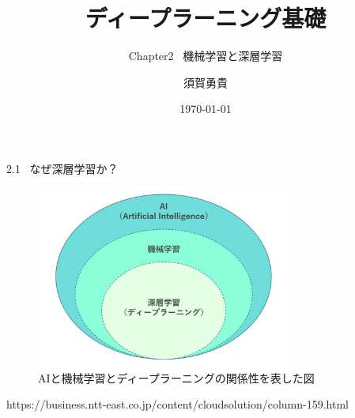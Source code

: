 \documentclass[dvipdfmx,8pt]{beamer}
\title{ディープラーニング基礎}
\subtitle{Chapter2 \ 機械学習と深層学習}
\author[須賀]{須賀勇貴}
\institute[茨大]{茨城大学大学院 \ 理工学研究科 \ 量子線科学専攻 \ 1年}
\date{\today}
\begin{document}
\frame{\maketitle}

  \begin{frame}{2.1 \ なぜ深層学習か？}
    \begin{figure}
      \begin{center}
        \includegraphics[height=6cm]{./AI_ML_DL.png}
      \end{center} 
      \caption{AIと機械学習とディープラーニングの関係性を表した図}  
    \end{figure}
    https://business.ntt-east.co.jp/content/cloudsolution/column-159.html
  \end{frame}
\end{document}
